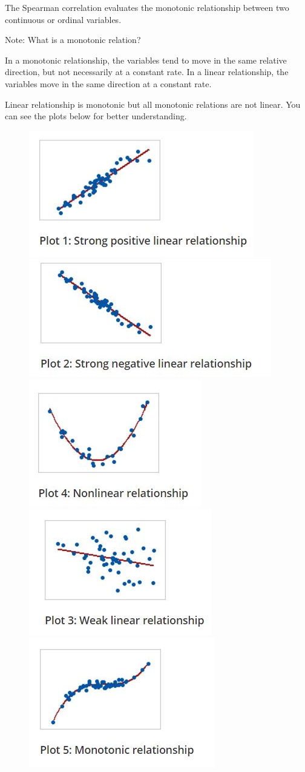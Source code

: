 \documentclass[
]{book}
\begin{document}
The Spearman correlation evaluates the monotonic relationship between
two continuous or ordinal variables.

Note: What is a monotonic relation?

In a monotonic relationship, the variables tend to move in the same
relative direction, but not necessarily at a constant rate. In a linear
relationship, the variables move in the same direction at a constant
rate.

Linear relationship is monotonic but all monotonic relations are not
linear. You can see the plots below for better understanding.

\begin{figure}

{\centering \includegraphics[width=0.49\linewidth]{images/image6c} \includegraphics[width=0.49\linewidth]{images/image7c} \includegraphics[width=0.49\linewidth]{images/image8c} \includegraphics[width=0.49\linewidth]{images/image9c} \includegraphics[width=0.49\linewidth]{images/image10c} 

}
\end{figure}
\end{document}
